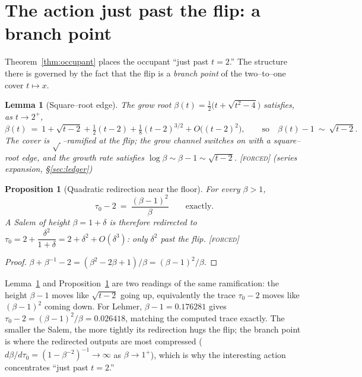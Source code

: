 \documentclass[11pt]{article}
\theoremstyle{plain}
\newtheorem{proposition}[theorem]{Proposition}
\newtheorem{lemma}[theorem]{Lemma}
\theoremstyle{definition}
\theoremstyle{remark}
\newcommand{\forced}{\textcolor{forcedc}{\textsc{[forced]}}}
\begin{document}
\section{The action just past the flip: a branch point}\label{sec:flip}

Theorem~\ref{thm:occupant} places the occupant ``just past $t=2$.'' The structure there is governed by the fact that the flip is a \emph{branch point} of the two--to--one cover $t\mapsto x$.

\begin{lemma}[Square--root edge]\label{lem:sqrtedge}
The grow root $\beta(t)=\tfrac12\bigl(t+\sqrt{t^2-4}\bigr)$ satisfies, as $t\to2^+$,
\[
\beta(t)\ =\ 1+\sqrt{t-2}+\tfrac12(t-2)+\tfrac18(t-2)^{3/2}+O\!\bigl((t-2)^{2}\bigr),
\qquad\text{so}\quad \beta(t)-1\ \sim\ \sqrt{t-2}.
\]
The cover is $\sqrt{\,}$--ramified at the flip; the grow channel switches on with a square--root edge, and the growth rate satisfies $\log\beta\sim\beta-1\sim\sqrt{t-2}$. \forced{} {\small(series expansion, \S\ref{sec:ledger})}
\end{lemma}

\begin{proposition}[Quadratic redirection near the floor]\label{prop:quad}
For every $\beta>1$,
\[
\tau_0-2\ =\ \frac{(\beta-1)^2}{\beta}\qquad\text{exactly.}
\]
A Salem of height $\beta=1+\delta$ is therefore redirected to $\tau_0=2+\dfrac{\delta^2}{1+\delta}=2+\delta^2+O(\delta^3)$: only $\delta^2$ past the flip. \forced
\end{proposition}
\begin{proof}
$\beta+\beta^{-1}-2=(\beta^2-2\beta+1)/\beta=(\beta-1)^2/\beta$.
\end{proof}

Lemma~\ref{lem:sqrtedge} and Proposition~\ref{prop:quad} are two readings of the same ramification: the height $\beta-1$ moves like $\sqrt{t-2}$ going up, equivalently the trace $\tau_0-2$ moves like $(\beta-1)^2$ coming down. For Lehmer, $\beta-1=0.176281$ gives $\tau_0-2=(\beta-1)^2/\beta=0.026418$, matching the computed trace exactly. The smaller the Salem, the more tightly its redirection hugs the flip; the branch point is where the redirected outputs are most compressed ($d\beta/d\tau_0=(1-\beta^{-2})^{-1}\to\infty$ as $\beta\to1^+$), which is why the interesting action concentrates ``just past $t=2$.''
\end{document}
